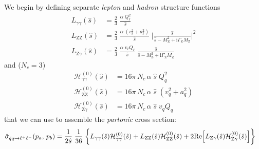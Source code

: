 \documentclass[11pt]{article}
\begin{document}
We begin by defining separate \emph{lepton} and \emph{hadron} structure functions
\begin{align}
  L_{\gamma\gamma}(\hat{s})
  &=
  \frac{2}{3}\;\frac{\alpha\; Q_\ell^2}{\hat{s}}
  \\
  L_{\mathrm{Z}\mathrm{Z}}(\hat{s})
  &=
  \frac{2}{3}\;\frac{\alpha\; (v_\ell^2 + a_\ell^2)}{\hat{s}}\;
  \biggl\lvert\frac{\hat{s}}{\hat{s} - M_\mathrm{Z}^2 + \mathrm{i}\Gamma_\mathrm{Z}M_\mathrm{Z}}\biggr\rvert^2
  \\
  L_{\mathrm{Z}\gamma}(\hat{s})
  &=
  \frac{2}{3}\;\frac{\alpha\; v_\ell Q_\ell }{\hat{s}}\;
  \frac{\hat{s}}{\hat{s} - M_\mathrm{Z}^2 + \mathrm{i}\Gamma_\mathrm{Z}M_\mathrm{Z}}
\end{align}
and (\(N_c = 3\))
\begin{align}
  \mathcal{H}^{(0)}_{\gamma\gamma}(\hat{s})
  &=
  16\pi\,N_c \, \alpha\;\hat{s} \; Q_q^2
  \\
  \mathcal{H}^{(0)}_{\mathrm{Z}\mathrm{Z}}(\hat{s})
  &=
  16\pi\,N_c \, \alpha\;\hat{s} \; (v_q^2 + a_q^2)
  \\
  \mathcal{H}^{(0)}_{\mathrm{Z}\gamma}(\hat{s})
  &=
  16\pi\,N_c \, \alpha\;\hat{s} \; v_q Q_q
\end{align}
that we can use to assemble the \emph{partonic} cross section:
\begin{align}
  \hat{\sigma}_{\bar{q}q\to\ell^+\ell^-}(p_a,\,p_b)
  &=
  \frac{1}{2\hat{s}} \; \frac{1}{36} \; \biggl\{
  L_{\gamma\gamma}(\hat{s}) \mathcal{H}^{(0)}_{\gamma\gamma}(\hat{s})
  + L_{\mathrm{Z}\mathrm{Z}}(\hat{s}) \mathcal{H}^{(0)}_{\mathrm{Z}\mathrm{Z}}(\hat{s})
  + 2\mathrm{Re}\Bigl[ L_{\mathrm{Z}\gamma}(\hat{s}) \mathcal{H}^{(0)}_{\mathrm{Z}\gamma}(\hat{s}) \Bigr]
  \biggr\}
\end{align}
\end{document}
